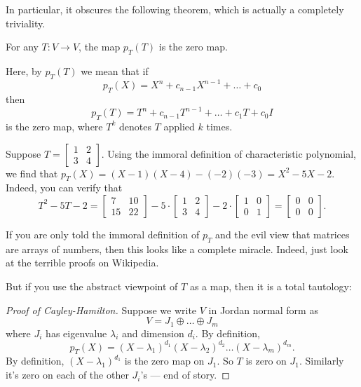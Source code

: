 In particular, it obscures the following theorem, which is actually a completely triviality.
\begin{theorem}
	For any $T : V \to V$,
	the map $p_T(T)$ is the zero map.
\end{theorem}
Here, by $p_T(T)$ we mean that if \[ p_T(X) = X^n + c_{n-1} X^{n-1} + \dots + c_0 \]
then \[ p_T(T) = T^n + c_{n-1} T^{n-1} + \dots + c_1 T +  c_0 I \] is the zero map,
where $T^k$ denotes $T$ applied $k$ times.

\begin{example}
	Suppose $T = \begin{bmatrix} 1 & 2 \\ 3 & 4 \end{bmatrix}$.
	Using the immoral definition of characteristic polynomial,
	we find that $p_T(X) = (X-1)(X-4)-(-2)(-3) = X^2 - 5X - 2$.
	Indeed, you can verify that
	\[ T^2 - 5T - 2
		= \begin{bmatrix}
			7 & 10 \\
			15 & 22
		\end{bmatrix}
		- 5 \cdot \begin{bmatrix}
			1 & 2 \\
			3 & 4
		\end{bmatrix}
		- 2 \cdot \begin{bmatrix}
			1 & 0 \\
			0 & 1
		\end{bmatrix}
		= \begin{bmatrix}
			0 & 0 \\
			0 & 0
		\end{bmatrix}.
	\]
\end{example}
If you are only told the immoral definition of $p_T$ and the evil view that matrices are
arrays of numbers, then this looks like a complete miracle.
Indeed, just look at the terrible proofs on Wikipedia.

But if you use the abstract viewpoint of $T$ as a map, then it is a total tautology:
\begin{proof}[Proof of Cayley-Hamilton]
	Suppose we write $V$ in Jordan normal form as
	\[ V = J_1 \oplus \dots \oplus J_m \]
	where $J_i$ has eigenvalue $\lambda_i$ and dimension $d_i$.
	By definition,
	\[ p_T(X) = (X - \lambda_1)^{d_1} (X - \lambda_2)^{d_2} \dots (X - \lambda_m)^{d_m}. \]
	By definition, $(X - \lambda_1)^{d_1}$ is the zero map on $J_1$.
	So $T$ is zero on $J_1$.
	Similarly it's zero on each of the other $J_i$'s --- end of story.
\end{proof}

